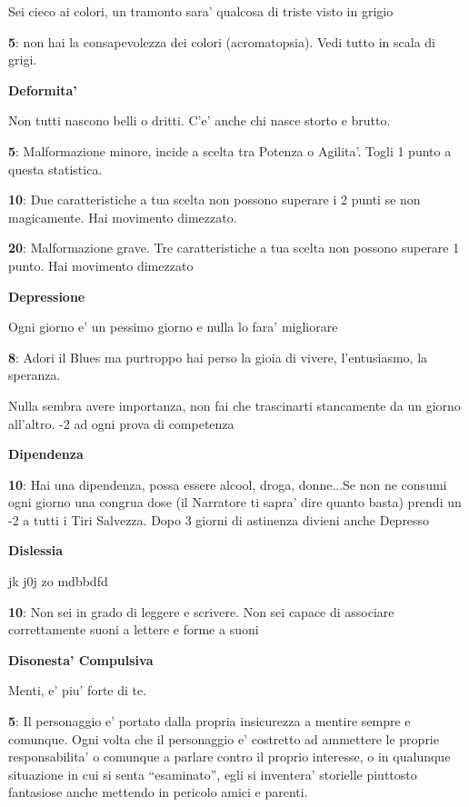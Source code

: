 \documentclass[a4paper,11pt,twoside,openany]{dndbook}
\begin{document}
{Sei cieco ai colori, un tramonto sara' qualcosa di triste visto in grigio

\textbf{5}: non hai la consapevolezza dei colori (acromatopsia). Vedi tutto in scala di grigi.

\textbf{Deformita'}

Non tutti nascono belli o dritti. C'e' anche chi nasce storto e brutto.

\textbf{5}: Malformazione minore, incide a scelta tra Potenza o Agilita'. Togli 1 punto a questa statistica.

\textbf{10}: Due caratteristiche a tua scelta non possono superare i 2 punti se non magicamente. Hai movimento dimezzato.

\textbf{20}: Malformazione grave. Tre caratteristiche a tua scelta non possono superare 1 punto. Hai movimento dimezzato

\textbf{Depressione}

Ogni giorno e' un pessimo giorno e nulla lo fara' migliorare

\textbf{8}: Adori il Blues ma purtroppo hai perso la gioia di vivere, l'entusiasmo, la speranza.

Nulla sembra avere importanza, non fai che trascinarti stancamente da un giorno all'altro. -2 ad ogni prova di competenza

\textbf{Dipendenza}

\textbf{10}: Hai una dipendenza, possa essere alcool, droga, donne...Se non ne consumi ogni giorno una congrua dose (il Narratore ti sapra' dire quanto basta) prendi un -2 a tutti i Tiri Salvezza. Dopo 3 giorni di astinenza divieni anche Depresso

\textbf{Dislessia}

jk j0j zo mdbbdfd

\textbf{10}: Non sei in grado di leggere e scrivere. Non sei capace di associare correttamente suoni a lettere e forme a suoni

\textbf{Disonesta' Compulsiva}

Menti, e' piu' forte di te.

\textbf{5}: Il personaggio e' portato dalla propria insicurezza a mentire sempre e comunque. Ogni volta che il personaggio e' costretto ad ammettere le proprie responsabilita' o comunque a parlare contro il proprio interesse, o in qualunque situazione in cui si senta ``esaminato'', egli si inventera' storielle piuttosto fantasiose anche mettendo in pericolo amici e parenti.

}
\end{document}

